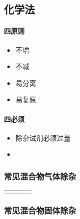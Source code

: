 \documentclass[10pt]{article}
\begin{document}
	
	\subsection{化学法}
	
	\paragraph{四原则}
	
	\begin{itemize}
		\item 不增
		\item 不减
		\item 易分离
		\item 易复原
	\end{itemize}
	
	\paragraph{四必须}
	
	\begin{itemize}
		\item 除杂试剂必须过量
		\item 
	\end{itemize}
	
	\subsubsection{常见混合物气体除杂}
	
	\begin{center}
	\tablelasttail{\hline}
	\begin{supertabular}{|m{2cm}<{ \centering}|m{1cm}<{ \centering}|m{5cm}<{ \centering}|m{5cm}<{ \centering}|}
		\hline
		& & & \\
	\end{supertabular}
	\end{center}
	
	\subsubsection{常见混合物固体除杂}
	
\end{document}
